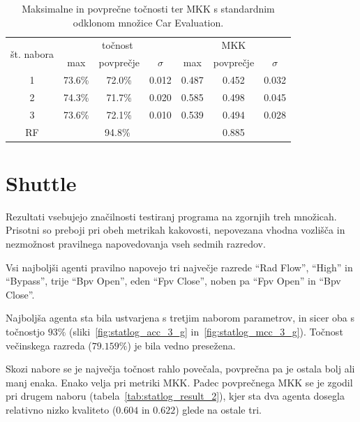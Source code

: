 \documentclass[a4paper,12pt,openright]{book}
\begin{document}
    \begin{table}[H]
        \begin{center}
            \begin{tabular}{|| c | c c c || c c c ||}
                \hline
                \multirow{2}{*}{št. nabora} & \multicolumn{3}{c||}{točnost} & \multicolumn{3}{c||}{MKK} \\ \cline{2-7}
                & max    & povprečje & $\sigma$ & max   & povprečje & $\sigma$ \\
                \hline
                1 & 73.6\% & 72.0\%    & 0.012    & 0.487 & 0.452     & 0.032    \\
                2 & 74.3\% & 71.7\%    & 0.020    & 0.585 & 0.498     & 0.045    \\
                3 & 73.6\% & 72.1\%    & 0.010    & 0.539 & 0.494     & 0.028    \\ \hline
                RF & \multicolumn{3}{c||}{94.8\%} & \multicolumn{3}{c||}{0.885} \\
                \hline
            \end{tabular}
        \end{center}
        \caption{Maksimalne in povprečne točnosti ter MKK s standardnim odklonom množice Car Evaluation.}
        \label{tab:car_result_aggregate}
    \end{table}

    \section{Shuttle}\label{sec:rezultati-shuttle}
    Rezultati vsebujejo značilnosti testiranj programa na zgornjih treh množicah.
    Prisotni so preboji pri obeh metrikah kakovosti, nepovezana vhodna vozlišča in nezmožnost pravilnega napovedovanja vseh sedmih
    razredov.

    Vsi najboljši agenti pravilno napovejo tri največje razrede \enquote{Rad Flow}, \enquote{High} in \enquote{Bypass}, trije
    \enquote{Bpv Open}, eden \enquote{Fpv Close}, noben pa \enquote{Fpv Open} in \enquote{Bpv Close}.

    Najboljša agenta sta bila ustvarjena s tretjim naborom parametrov, in sicer oba s točnostjo $93\%$ (sliki~\ref{fig:statlog_acc_3_g} in~\ref{fig:statlog_mcc_3_g}).
    Točnost večinskega razreda ($79.159\%$) je bila vedno presežena.

    Skozi nabore se je največja točnost rahlo povečala, povprečna pa je ostala bolj ali manj enaka.
    Enako velja pri metriki MKK.
    Padec povprečnega MKK se je zgodil pri drugem naboru (tabela~\ref{tab:statlog_result_2}), kjer sta dva agenta dosegla relativno nizko kvaliteto ($0.604$ in $0.622$)
    glede na ostale tri.
\end{document}
